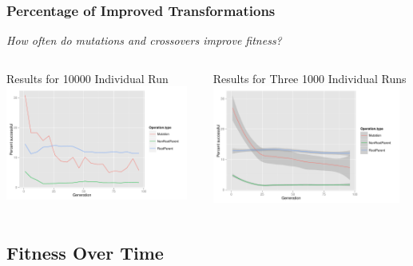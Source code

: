 \documentclass{beamer}
\begin{document}
\begin{frame}
\frametitle{Percentage of Improved Transformations}
\emph{How often do mutations and crossovers improve fitness?}
\begin{columns}
\begin{column}{0.5\textwidth}
\begin{center}
{\tiny Results for 10000 Individual Run}
\includegraphics[width=0.95\textwidth]{Blocked_success_percentages}
\end{center}
\end{column}
\begin{column}{0.5\textwidth}
\begin{center}
{\tiny Results for Three 1000 Individual Runs}
\includegraphics[width=0.95\textwidth]{Percent_successful_Axiom_1K_runs}
\end{center}
\end{column}
\end{columns}
\end{frame}

\subsection[Fitness Graph]{Fitness Over Time}
\end{document}
